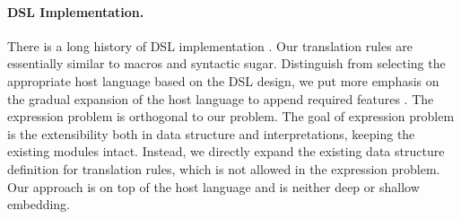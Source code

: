 \paragraph{DSL Implementation.}
There is a long history of DSL implementation \cite{MartinDSL,when-how-dsl}.
Our translation rules are essentially similar to macros and syntactic sugar.
Distinguish from selecting the appropriate host language based on the DSL design,
 we put more emphasis on the gradual expansion of the host language to append required features \cite{MoggiMeta}.
The expression problem \cite{expr-problem} is orthogonal to our problem.
The goal of expression problem is the extensibility both in data structure and interpretations,
 keeping the existing modules intact.
Instead, we directly expand the existing data structure definition for translation rules,
 which is not allowed in the expression problem.
Our approach is on top of the host language and is neither deep or shallow embedding.
